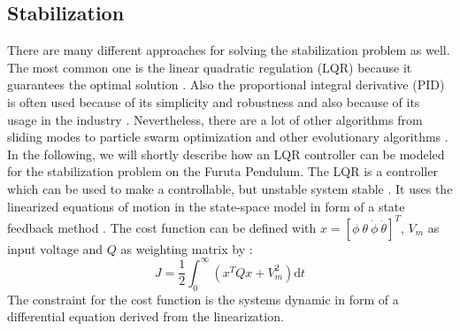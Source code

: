 \subsection{Stabilization}
There are many different approaches for solving the stabilization problem as 
well. The most common one is the linear quadratic regulation (LQR) because it 
guarantees the optimal solution \citep{hamza2019current}. Also the 
proportional integral derivative (PID) is often used because of its simplicity 
and robustness and also because of its usage in the industry 
\citep{hassanzadeh2011controller}. Nevertheless, there are a lot of other 
algorithms from sliding modes \citep{izutsu2008swing} to particle swarm 
optimization and other evolutionary algorithms 
\citep{hassanzadeh2011controller}.
In the following, we will shortly describe how an LQR controller can be modeled 
for the stabilization problem on the Furuta Pendulum. The LQR is a controller 
which can be used to make a controllable, but unstable system stable 
\citep{park2011swing}. It uses the linearized equations of motion in the 
state-space model in form of a state feedback method \citep{ozbek2010swing}. 
The cost function can be defined with $x=[\phi \ \theta \ \dot{\phi}\ 
\dot{\theta}]^T$, $V_m$ as input voltage and $Q$ as weighting matrix by 
\citep{ozbek2010swing}:
\[J=\frac{1}{2}\int_{0}^{\infty}(x^TQx+V_m^2)\text{d}t\]
The constraint for the cost function is the systems dynamic in form of a 
differential equation derived from the linearization.

